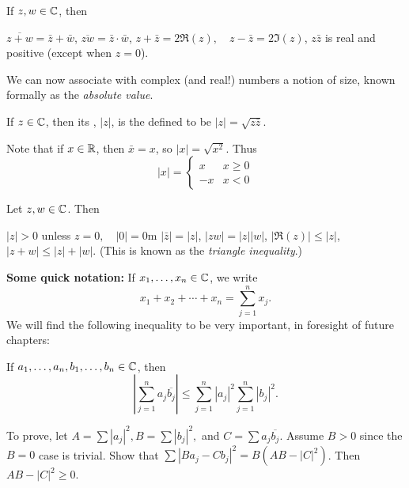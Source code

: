\documentclass{article}
\begin{document}
\begin{theorem}
    If $z,w\in\mathbb C$, then \begin{enumerate}
        \ii $\overline{z+w}=\bar{z}+\bar{w}$,
        \ii $\overline{zw}=\bar{z}\cdot\bar{w}$,
        \ii $z+\bar{z}=2\Re(z),\quad z-\bar{z}=2\Im(z)$,
        \ii $z\bar{z}$ is real and positive (except when $z=0$).
    \end{enumerate}
\end{theorem}
We can now associate with complex (and real!) numbers a notion of size, known formally as the \emph{absolute value}.
\begin{definition}
    If $z\in\mathbb C$, then its , $|z|$, is the defined to be $|z|=\sqrt{z\bar{z}}$.
\end{definition}
\begin{remark}
    Note that if $x\in\mathbb R$, then $\bar{x}=x$, so $|x|=\sqrt{x^{2}}$. Thus \[|x|=\begin{cases}
        x & x\geq 0 \\
        -x & x < 0
    \end{cases}\]
\end{remark}
\begin{theorem}
    Let $z,w\in\mathbb C$. Then 
    \begin{enumerate}
        \ii $|z|>0$ unless $z=0,\quad|0|=0$m
        \ii $|\bar{z}|=|z|$,
        \ii $|zw|=|z||w|$,
        \ii $|\Re(z)|\leq |z|$,
        \ii $|z+w|\leq|z|+|w|$. (This is known as the \emph{triangle inequality}.)
    \end{enumerate}
\end{theorem}
\textbf{Some quick notation:} If $x_{1},\dotsc,x_{n}\in\mathbb C$, we write \[x_{1}+x_{2}+\dotsi+x_{n}=\sum_{j=1}^{n}x_{j}.\]
We will find the following inequality to be very important, in foresight of future chapters:
\begin{theorem}
    If $a_{1},\dotsc, a_{n},b_{1},\dotsc,b_{n}\in\mathbb C$, then \[\left|\sum_{j=1}^{n}a_{j}\overline{b_{j}}\right|\leq \sum_{j=1}^{n}|a_{j}|^{2}\sum_{j=1}^{n}|b_{j}|^{2}.\]
\end{theorem}
\begin{remark}
    To prove, let $A=\sum|a_{j}|^{2},B=\sum|b_{j}|^{2},$ and $C=\sum a_{j}\overline{b_{j}}$. Assume $B>0$ since the $B=0$ case is trivial. Show that $\sum|Ba_{j}-Cb_{j}|^{2}=B(AB-|C|^{2})$. Then $AB-|C|^{2}\geq 0$.
\end{remark}


\newpage
\end{document}
